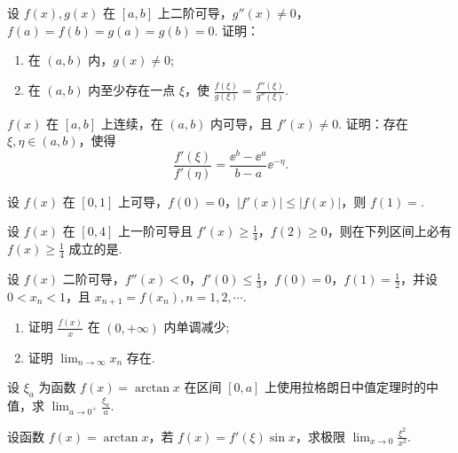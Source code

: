 	\begin{ti}
		设 $f(x), g(x)$ 在 $[a,b]$ 上二阶可导，$g''(x) \ne 0$，$f(a) = f(b) = g(a) = g(b) = 0$. 证明：
		\begin{enumerate}
			\item 在 $(a,b)$ 内，$g(x) \ne 0$;
			\item 在 $(a,b)$ 内至少存在一点 $\xi$，使 $\frac{f(\xi)}{g(\xi)} = \frac{f''(\xi)}{g''(\xi)}$.
		\end{enumerate}
	\end{ti}

	\begin{ti}
		$f(x)$ 在 $[a,b]$ 上连续，在 $(a,b)$ 内可导，且 $f'(x) \ne 0$. 证明：存在 $\xi, \eta \in (a,b)$，使得
		\[
			\frac{f'(\xi)}{f'(\eta)} = \frac{\ee^{b} - \ee^{a}}{b - a} \ee^{-\eta}.
		\]
	\end{ti}

	\begin{ti}
		设 $f(x)$ 在 $[0,1]$ 上可导，$f(0) = 0$，$\left| f'(x) \right| \leq \left| f(x) \right|$，则 $f(1) = $\htwo.
	\end{ti}

	\begin{ti}
		设 $f(x)$ 在 $[0,4]$ 上一阶可导且 $f'(x) \geq \frac{1}{4}$，$f(2) \geq 0$，则在下列区间上必有 $f(x) \geq \frac{1}{4}$ 成立的是\kuo.

		\fourch{$[0,1]$}{$[1,2]$}{$[2,3]$}{$[3,4]$}
	\end{ti}

	\begin{ti}
		设 $f(x)$ 二阶可导，$f''(x) < 0$，$f'(0) \leq \frac{1}{3}$，$f(0) = 0$，$f(1) = \frac{1}{2}$，并设 $0 < x_{n} < 1$，且 $x_{n+1} = f(x_{n}), n = 1,2,\cdots$.
		\begin{enumerate}
			\item 证明 $\frac{f(x)}{x}$ 在 $(0,+\infty)$ 内单调减少;
			\item 证明 $\lim_{n \to \infty} x_{n}$ 存在.
		\end{enumerate}
	\end{ti}

	\begin{ti}
		设 $\xi_{a}$ 为函数 $f(x) = \arctan x$ 在区间 $[0,a]$ 上使用拉格朗日中值定理时的中值，求 $\lim_{a \to 0^{+}} \frac{\xi_{a}}{a}$.
	\end{ti}

	\begin{ti}
		设函数 $f(x) = \arctan x$，若 $f(x) = f'(\xi) \sin x$，求极限 $\lim_{x \to 0} \frac{\xi^{2}}{x^{2}}$.
	\end{ti}


